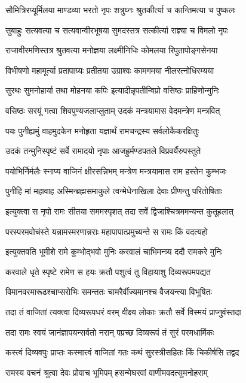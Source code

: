 \twolineshloka
{सौमित्रिरप्यूर्मिलया माण्डव्या भरतो नृपः}
{शत्रुघ्नः श्रुतकीर्त्या च कान्तिमत्या च पुष्कलः}%

\twolineshloka
{सुबाहुः सत्यवत्या च सत्यवान्वीरभूषया}
{सुमदस्तत्र सत्कीर्त्या राज्ञ्या च विमलो नृपः}%

\twolineshloka
{राजावीरमणिस्तत्र श्रुतवत्या मनोज्ञया}
{लक्ष्मीनिधिः कोमलया रिपुतापोङ्गसेनया}%

\twolineshloka
{विभीषणो महामूर्त्या प्रतापाग्र्यः प्रतीतया}
{उग्राश्वः कामगमया नीलरत्नोधिरम्यया}%

\twolineshloka
{सुरथः सुमनोहार्या तथा मोहनया कपिः}
{इत्यादीन्नृपतीन्विप्रो वसिष्ठः प्राहिणोन्मुनिः}%

\twolineshloka
{वसिष्ठः सरयूं गत्वा शिवपुण्यजलाप्लुताम्}
{उदकं मन्त्रयामास वेदमन्त्रेण मन्त्रवित्}%

\twolineshloka
{पयः पुनीह्यमुं वाहमुदकेन मनोहृता}
{यज्ञार्थं रामचन्द्रस्य सर्वलोकैकरक्षितुः}%

\twolineshloka
{उदकं तन्मुनिस्पृष्टं सर्वे रामादयो नृपाः}
{आजह्रुर्मण्डपतले विप्रवर्यैरुपस्तुते}%

\twolineshloka
{पयोभिर्निर्मलैः स्नाप्य वाजिनं क्षीरसन्निभम्}
{मन्त्रेण मन्त्रयामास राम हस्तेन कुम्भजः}%

\twolineshloka
{पुनीहि मां महावाह अस्मिन्ब्रह्मसमाकुले}
{त्वन्मेधेनाखिला देवाः प्रीणन्तु परितोषिताः}%

\twolineshloka
{इत्युक्त्वा स नृपो रामः सीतया सममस्पृशत्}
{तदा सर्वे द्विजाश्चित्रममन्यन्त कुतूहलात्}%

\twolineshloka
{परस्परमवोचंस्ते यन्नामस्मरणान्नराः}
{महापापात्प्रमुच्यन्ते स रामः किं वदत्यहो}%

\twolineshloka
{इत्युक्तवति भूमीशे रामे कुम्भोद्भवो मुनिः}
{करवालं चाभिमन्त्र्य ददौ रामकरे मुनिः}%

\twolineshloka
{करवाले धृते स्पृष्टे रामेण स हयः क्रतौ}
{पशुत्वं तु विहायाशु दिव्यरूपमपद्यत}%

\twolineshloka
{विमानवरमारूढश्चाप्सरोभिः समन्ततः}
{चामरैर्वीज्यमानश्च वैजयन्त्या विभूषितः}%

\twolineshloka
{तदा तं वाजितां त्यक्त्वा दिव्यरूपधरं वरम्}
{वीक्ष्य लोकाः क्रतौ सर्वे विस्मयं प्राप्नुवंस्तदा}%

\twolineshloka
{तदा रामः स्वयं जानंज्ञापयन्सर्वतो नरान्}
{पप्रच्छ दिव्यरूपं तं सुरं परमधार्मिकः}%

\twolineshloka
{कस्त्वं दिव्यवपुः प्राप्तः कस्मात्त्वं वाजितां गतः}
{कथं सुरस्त्रीसहितः किं चिकीर्षसि तद्वद}%

\twolineshloka
{रामस्य वचनं श्रुत्वा देवः प्रोवाच भूमिपम्}
{हसन्मेघरवां वाणीमवदत्सुमनोहराम्}%

